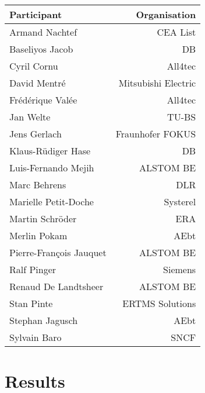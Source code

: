 \documentclass[a4paper]{article}
\begin{document}
\begin{tabular}{|l|r|}
\hline
\textbf{Participant} & \textbf{Organisation}
\\\hline
Armand Nachtef & CEA List \\
Baseliyos Jacob & DB \\ 
Cyril Cornu & All4tec \\
David Mentr\'{e} & Mitsubishi Electric \\
Fr\'{e}d\'{e}rique Val\'{e}e & All4tec \\
Jan Welte & TU-BS \\
Jens Gerlach & Fraunhofer FOKUS \\
Klaus-R\"udiger Hase & DB \\
Luis-Fernando Mejih &  ALSTOM BE \\
Marc Behrens & DLR \\
Marielle Petit-Doche & Systerel \\ 
Martin Schr\"{o}der & ERA \\
Merlin Pokam & AEbt \\
Pierre-Fran\c{c}ois Jauquet & ALSTOM BE\\
Ralf Pinger & Siemens \\
Renaud De Landtsheer & ALSTOM BE \\
Stan Pinte & ERTMS Solutions \\
Stephan Jagusch & AEbt \\
Sylvain Baro & SNCF 
\\\hline
\end{tabular}

\renewcommand{\contentsname}{Agenda}
\label{sec:agenda}
\tableofcontents

\section*{Results}

\end{document}
